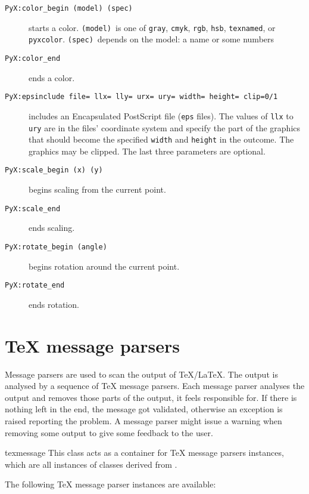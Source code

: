 \begin{description}
\item[\texttt{PyX:color\_begin (model) (spec)}]
  starts a color. \texttt{(model)}~is one of
  \texttt{gray}, \texttt{cmyk}, \texttt{rgb}, \texttt{hsb}, \texttt{texnamed}, or
  \texttt{pyxcolor}. \texttt{(spec)}~depends on the model: a name or
  some numbers
\item[\texttt{PyX:color\_end}]
  ends a color.
\item[\texttt{PyX:epsinclude file= llx= lly= urx= ury= width= height= clip=0/1}]
  includes an Encapsulated PostScript file (\texttt{eps}
  files). The values of \texttt{llx} to \texttt{ury} are in the files'
  coordinate system and specify the part of the graphics that should
  become the specified \texttt{width} and \texttt{height} in the
  outcome. The graphics may be clipped. The last three parameters are
  optional.
\item[\texttt{PyX:scale\_begin (x) (y)}]
  begins scaling from the current point.
\item[\texttt{PyX:scale\_end}]
  ends scaling.
\item[\texttt{PyX:rotate\_begin (angle)}]
  begins rotation around the current point.
\item[\texttt{PyX:rotate\_end}]
  ends rotation.
\end{description}

\section[TeX message parsers]%
{\TeX{} message parsers}

Message parsers are used to scan the output of \TeX/\LaTeX. The output
is analysed by a sequence of \TeX{} message parsers. Each message
parser analyses the output and removes those parts of the output, it
feels responsible for. If there is nothing left in the end, the
message got validated, otherwise an exception is raised reporting the
problem. A message parser might issue a warning when removing some
output to give some feedback to the user.

\begin{classdesc}{texmessage}{}
  This class acts as a container for \TeX{} message parsers instances,
  which are all instances of classes derived from .
\end{classdesc}

The following \TeX{} message parser instances are available:

